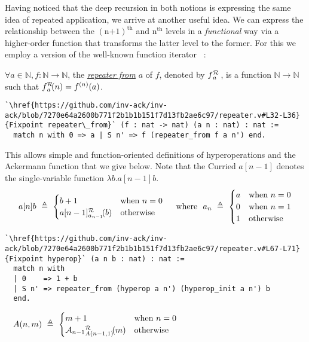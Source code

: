 Having noticed that the deep recursion in both notions is expressing the same idea
of repeated application, we arrive at another useful idea. We can express the relationship
between the $(\text{n+1})^{\text{th}}$ and $\text{n}^{\text{th}}$ levels in
a \emph{functional} way via a higher-order function that transforms the latter level
to the former. For this we employ a version of the well-known function iterator
~\cite{bertotcast}:
\begin{defn}
$\forall a\in \mathbb{N}, f: \mathbb{N}\to \mathbb{N}$, the
\href{https://github.com/inv-ack/inv-ack/blob/7270e64a2600b771f2b1b1b151f7d13fb2ae6c97/repeater.v#L32-L36}{\emph{repeater from}}
$a$ of $f$, denoted by $\rf{f}{a}$ , is a function $\mathbb{N}\to \mathbb{N}$ such that $\rf{f}{a}(n) = f^{(n)}(a)$.
\begin{lstlisting}
`\href{https://github.com/inv-ack/inv-ack/blob/7270e64a2600b771f2b1b1b151f7d13fb2ae6c97/repeater.v#L32-L36}{Fixpoint repeater\_from}` (f : nat -> nat) (a n : nat) : nat :=
  match n with 0 => a | S n' => f (repeater_from f a n') end.
\end{lstlisting}
\end{defn}
This allows simple and function-oriented definitions of hyperoperations and the
Ackermann function that we give below. Note that the Curried $a[n-1]$ denotes
the single-variable function $\lambda b.a[n-1]b$.
\vspace{-0.5em}
\begin{equation*}
\vspace{-0.75em}
a[n]b ~ \triangleq ~ \begin{cases}
b + 1 & \text{when } n = 0 \\
\rf{a[n-1]}{a_{n-1}}(b) & \text{otherwise}
\end{cases}
\quad \text{ where } \ a_n ~ \triangleq ~ \begin{cases}
a & \text{when } n = 0 \\
0 & \text{when } n = 1 \\
1 & \text{otherwise}
\end{cases}
\end{equation*}
\begin{lstlisting} 
`\href{https://github.com/inv-ack/inv-ack/blob/7270e64a2600b771f2b1b1b151f7d13fb2ae6c97/repeater.v#L67-L71}{Fixpoint hyperop}` (a n b : nat) : nat :=
  match n with
  | 0    => 1 + b
  | S n' => repeater_from (hyperop a n') (hyperop_init a n') b
  end.
\end{lstlisting}
\begin{equation*}
A(n,m) ~ \triangleq ~ \begin{cases}
m + 1 & \text{when } n = 0 \\
\rf{\mathcal{A}_{n-1}}{A(n-1,1)}(m) & \text{otherwise}
\end{cases} \qquad \qquad \qquad \qquad \qquad \qquad \qquad ~ 
\end{equation*}
